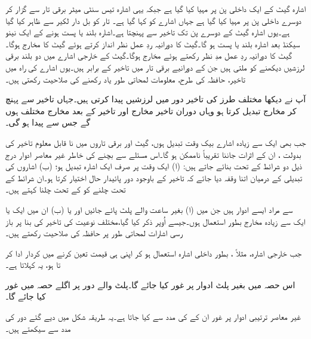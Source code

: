  اشارہ  گیٹ کے ایک داخلی پن پر مہیا کیا گیا ہے جبکہ یہی اشارہ تیس سنٹی میٹر برقی تار سے گزار کر دوسرے داخلی پن پر مہیا کیا گیا ہے جہاں اشارے کو  کہا گیا ہے۔ تار کو بل دار لکیر سے ظاہر کیا گیا ہے۔یوں اشارہ  گیٹ کے دوسرے پن تک تاخیر سے پہنچتا ہے۔اشارہ  بلند یا پست ہونے کے ایک نینو سیکنڈ بعد اشارہ  بلند یا پست ہو گا۔گیٹ کا دورانیہ ردِ عمل نظر انداز کرتے ہوئے گیٹ کا مخارج  ہوگا۔ گیٹ کا دورانیہ ردِ عمل مدِ نظر رکھتے ہوئے مخارج  ہوگا۔گیٹ کے خارجی اشارے میں دو بلند برقی لرزشیں دیکھنے کو ملتی ہیں جن کے دورانیے برقی تار میں تاخیر کے برابر ہیں۔یوں اشارے کی راہ میں تاخیر، حافظہ کی طرح، معلومات لمحاتی طور یاد رکھنے کی صلاحیت رکھتی ہیں۔

آپ نے دیکھا مختلف طرز کی تاخیر دور میں لرزشیں پیدا کرتی ہیں۔جہاں تاخیر سے پہنچ کر مخارج تبدیل کرتا ہو وہاں دوران تاخیر مخارج اور تاخیر کے بعد مخارج مختلف ہوں گے جس سے  پیدا ہو گی۔

 جب بھی ایک سے زیادہ اشارے بیک وقت تبدیل ہوں، گیٹ اور برقی تاروں میں نا قابل معلوم تاخیر کی بدولت ، ان کے اثرات جاننا تقریباً ناممکن ہو گا۔اس مسئلے سے بچنے کی خاطر غیر معاصر ادوار درج ذیل دو شرائط کے تحت بنائے جاتے ہیں: (ا) ایک وقت پر صرف ایک اشارہ تبدیل ہو؛ (ب) اشاروں کی تبدیلی کے درمیان اتنا وقفہ دیا جائے کہ تاخیر کے باوجود دور پائیدار حال اختیار کرتا ہو۔ان شرائط کے تحت چلنے کو  کے تحت چلنا کہتے ہیں۔

 سے مراد ایسے ادوار ہیں جن میں (ا) بغیر ساعت والے پلٹ پائے جائیں اور یا (ب) ان میں ایک یا ایک سے زیادہ مخارج بطور  استعمال ہوں۔جیسے اُوپر ذکر کیا گیا،مختلف نوعیت کی تاخیر کی بنا پر باز رسی اشارات لمحاتی طور پر حافظہ کی صلاحیت رکھتے ہیں۔

جب خارجی اشارہ، مثلاً ، بطور داخلی اشارہ استعمال ہو کر اپنی ہی قیمت  تعین کرنے میں کردار ادا کر تا ہو، یہ  کہلاتا ہے۔

اس حصہ میں بغیر پلٹ ادوار پر غور کیا جائے گا۔پلٹ والے دور پر اگلے حصہ میں غور کیا جائے گا۔

غیر معاصر ترتیبی ادوار پر غور ان کے  کی مدد سے کیا جاتا ہے۔یہ طریقہ شکل  میں دیے گئے دور کی مدد سے سیکھتے ہیں۔

